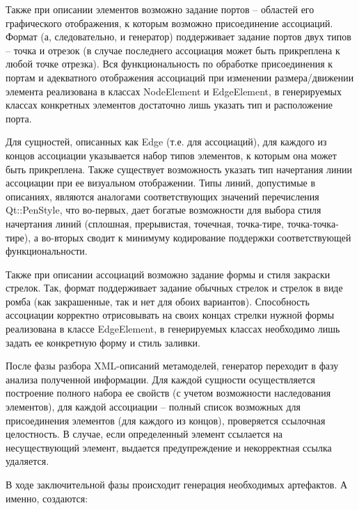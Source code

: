 \documentclass[a4paper]{article}
\begin{document}
{
Также при описании элементов возможно задание портов – областей его
графического отображения, к которым возможно присоединение ассоциаций.
Формат (а, следовательно, и генератор) поддерживает задание портов двух
типов – точка и отрезок (в случае последнего ассоциация может быть
прикреплена к любой точке отрезка). Вся функциональность по обработке
присоединения к портам и адекватного отображения ассоциаций при
изменении размера/движении элемента реализована в классах
\foreignlanguage{english}{NodeElement} и
\foreignlanguage{english}{EdgeElement}, в генерируемых классах
конкретных элементов достаточно лишь указать тип и расположение порта.}

{
Для сущностей, описанных как \foreignlanguage{english}{Edge} (т.е. для
ассоциаций), для каждого из концов ассоциации указывается набор типов
элементов, к которым она может быть прикреплена. Также существует
возможность указать тип начертания линии ассоциации при ее визуальном
отображении. Типы линий, допустимые в описаниях, являются аналогами
соответствующих значений перечисления
\foreignlanguage{english}{Qt}::\foreignlanguage{english}{PenStyle}, что
во-первых, дает богатые возможности для выбора стиля начертания линий
(сплошная, прерывистая, точечная, точка-тире, точка-точка-тире), а
во-вторых сводит к минимуму кодирование поддержки соответствующей
функциональности. }

{
Также при описании ассоциаций возможно задание формы и стиля закраски
стрелок. Так, формат поддерживает задание обычных стрелок и стрелок в
виде ромба (как закрашенные, так и нет для обоих вариантов).
Способность ассоциации корректно отрисовывать на своих концах стрелки
нужной формы реализована в классе
\foreignlanguage{english}{EdgeElement}, в генерируемых классах
необходимо лишь задать ее конкретную форму и стиль заливки.}

{
После фазы разбора \foreignlanguage{english}{XML}{}-описаний
метамоделей, генератор переходит в фазу анализа полученной информации.
Для каждой сущности осуществляется построение полного набора ее свойств
(с учетом возможности наследования элементов), для каждой ассоциации –
полный список возможных для присоединения элементов (для каждого из
концов), проверяется ссылочная целостность. В случае, если определенный
элемент ссылается на несуществующий элемент, выдается предупреждение и
некорректная ссылка удаляется. }

{
В ходе заключительной фазы происходит генерация необходимых артефактов.
А именно, создаются:}
\end{document}
